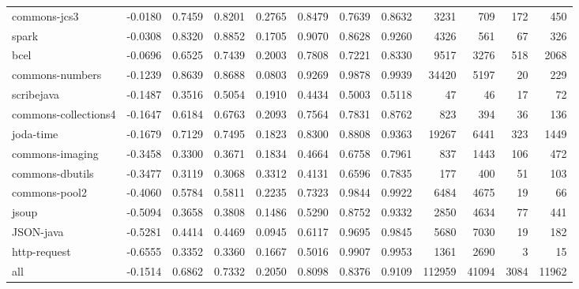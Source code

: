 \begin{table*}
\begin{tabular}{lrrrrrrrrrrr}
           commons-jcs3 &     -0.0180 &  0.7459 &     0.8201 &     0.2765 &  0.8479 &     0.7639 &   0.8632 &    3231 &    709 &   172 &    450 \\
                  spark &     -0.0308 &  0.8320 &     0.8852 &     0.1705 &  0.9070 &     0.8628 &   0.9260 &    4326 &    561 &    67 &    326 \\
                   bcel &     -0.0696 &  0.6525 &     0.7439 &     0.2003 &  0.7808 &     0.7221 &   0.8330 &    9517 &   3276 &   518 &   2068 \\
        commons-numbers &     -0.1239 &  0.8639 &     0.8688 &     0.0803 &  0.9269 &     0.9878 &   0.9939 &   34420 &   5197 &    20 &    229 \\
             scribejava &     -0.1487 &  0.3516 &     0.5054 &     0.1910 &  0.4434 &     0.5003 &   0.5118 &      47 &     46 &    17 &     72 \\
   commons-collections4 &     -0.1647 &  0.6184 &     0.6763 &     0.2093 &  0.7564 &     0.7831 &   0.8762 &     823 &    394 &    36 &    136 \\
              joda-time &     -0.1679 &  0.7129 &     0.7495 &     0.1823 &  0.8300 &     0.8808 &   0.9363 &   19267 &   6441 &   323 &   1449 \\
        commons-imaging &     -0.3458 &  0.3300 &     0.3671 &     0.1834 &  0.4664 &     0.6758 &   0.7961 &     837 &   1443 &   106 &    472 \\
        commons-dbutils &     -0.3477 &  0.3119 &     0.3068 &     0.3312 &  0.4131 &     0.6596 &   0.7835 &     177 &    400 &    51 &    103 \\
          commons-pool2 &     -0.4060 &  0.5784 &     0.5811 &     0.2235 &  0.7323 &     0.9844 &   0.9922 &    6484 &   4675 &    19 &     66 \\
                  jsoup &     -0.5094 &  0.3658 &     0.3808 &     0.1486 &  0.5290 &     0.8752 &   0.9332 &    2850 &   4634 &    77 &    441 \\
              JSON-java &     -0.5281 &  0.4414 &     0.4469 &     0.0945 &  0.6117 &     0.9695 &   0.9845 &    5680 &   7030 &    19 &    182 \\
           http-request &     -0.6555 &  0.3352 &     0.3360 &     0.1667 &  0.5016 &     0.9907 &   0.9953 &    1361 &   2690 &     3 &     15 \\
                    all &     -0.1514 &  0.6862 &     0.7332 &     0.2050 &  0.8098 &     0.8376 &   0.9109 &  112959 &  41094 &  3084 &  11962 \\
\bottomrule
\end{tabular}
\end{table*}
